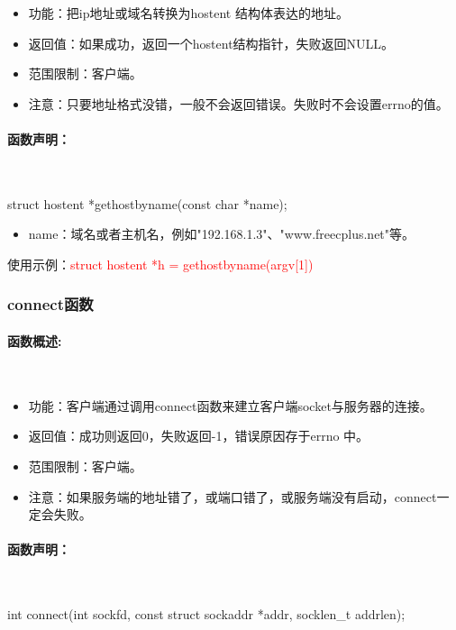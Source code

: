 \documentclass[UTF8]{article}%
\begin{document}
\begin{itemize}
    \item 功能：把ip地址或域名转换为hostent 结构体表达的地址。
    \item 返回值：如果成功，返回一个hostent结构指针，失败返回NULL。
    \item 范围限制：客户端。
    \item 注意：只要地址格式没错，一般不会返回错误。失败时不会设置errno的值。
\end{itemize}

\paragraph{函数声明：}~{}

struct hostent *gethostbyname(const char *name);

\begin{itemize}
    \item name：域名或者主机名，例如"192.168.1.3"、"www.freecplus.net"等。
\end{itemize}

使用示例：\textcolor{red}{struct hostent *h = gethostbyname(argv[1])}

\subsubsection{connect函数}

\paragraph{函数概述:}~{}

\begin{itemize}
    \item 功能：客户端通过调用connect函数来建立客户端socket与服务器的连接。
    \item 返回值：成功则返回0，失败返回-1，错误原因存于errno 中。
    \item 范围限制：客户端。
    \item 注意：如果服务端的地址错了，或端口错了，或服务端没有启动，connect一定会失败。
\end{itemize}

\paragraph{函数声明：}~{}

int connect(int sockfd, const struct sockaddr *addr, socklen\_t addrlen);
\end{document}
